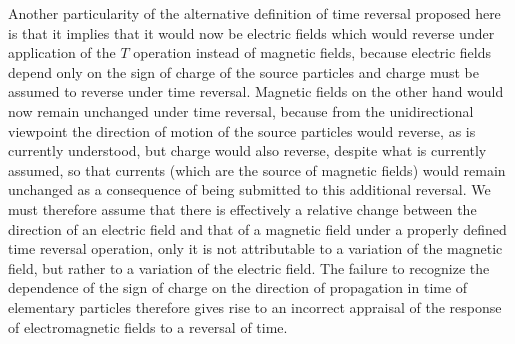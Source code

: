 \documentclass[notitlepage,12pt]{report}
\begin{document}
Another particularity of the alternative definition of time reversal proposed here is that it implies that it would now be electric fields which would reverse under application of the $T$ operation instead of magnetic fields, because electric fields depend only on the sign of charge of the source particles and charge must be assumed to reverse under time reversal. Magnetic fields on the other hand would now remain unchanged under time reversal, because from the unidirectional viewpoint the direction of motion of the source particles would reverse, as is currently understood, but charge would also reverse, despite what is currently assumed, so that currents (which are the source of magnetic fields) would remain unchanged as a consequence of being submitted to this additional reversal. We must therefore assume that there is effectively a relative change between the direction of an electric field and that of a magnetic field under a properly defined time reversal operation, only it is not attributable to a variation of the magnetic field, but rather to a variation of the electric field. The failure to recognize the dependence of the sign of charge on the direction of propagation in time of elementary particles therefore gives rise to an incorrect appraisal of the response of electromagnetic fields to a reversal of time.
\end{document}
